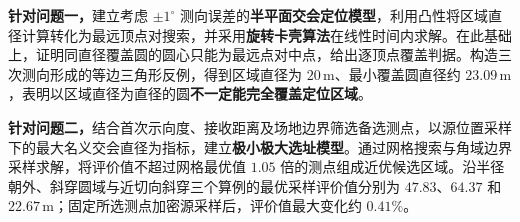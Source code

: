 
\textbf{针对问题一，}建立考虑 $\pm1^\circ$ 测向误差的\textbf{半平面交会定位模型}，利用凸性将区域直径计算转化为最远顶点对搜索，并采用\textbf{旋转卡壳算法}在线性时间内求解。在此基础上，证明同直径覆盖圆的圆心只能为最远点对中点，给出逐顶点覆盖判据。构造三次测向形成的等边三角形反例，得到区域直径为 $20\,\mathrm{m}$、最小覆盖圆直径约 $23.09\,\mathrm{m}$，表明以区域直径为直径的圆\textbf{不一定能完全覆盖定位区域}。

\textbf{针对问题二，}结合首次示向度、接收距离及场地边界筛选备选测点，以源位置采样下的最大名义交会直径为指标，建立\textbf{极小极大选址模型}。通过网格搜索与角域边界采样求解，将评价值不超过网格最优值 $1.05$ 倍的测点组成近优候选区域。沿半径朝外、斜穿圆域与近切向斜穿三个算例的最优采样评价值分别为 $47.83$、$64.37$ 和 $22.67\,\mathrm{m}$；固定所选测点加密源采样后，评价值最大变化约 $0.41\%$。

